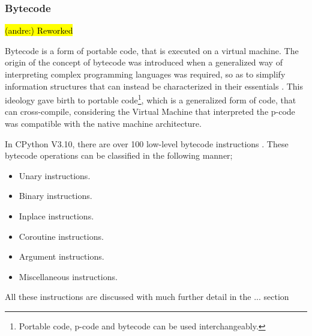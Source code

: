 \documentclass[12pt, a4paper]{report}
\DeclareRobustCommand{\andre}[1]{ {\begingroup\sethlcolor{BurntOrange}\hl{(andre:) #1}\endgroup} }
\theoremstyle{definition}
\theoremstyle{definition}%
\theoremstyle{definition}%
\theoremstyle{definition}%
\theoremstyle{definition}%
\theoremstyle{definition}%
\begin{document}
{            \subsubsection*{Bytecode}
            \label{subsubsec:bytecode}
            \andre{Reworked}
            \par Bytecode is a form of portable code, that is executed on a virtual machine. The origin of the concept of bytecode was introduced when a generalized way 
            of interpreting complex programming languages was required, so as to simplify information structures that can instead be characterized in their essentials \cite{landin1964mechanical}.
            This ideology gave birth to portable code\footnote{Portable code, p-code and bytecode can be used interchangeably.}, which is a  generalized form of code, that can cross-compile, considering
            the Virtual Machine that interpreted the p-code was compatible with the native machine architecture. 
            \par In CPython V3.10, there are over 100 low-level bytecode instructions \cite{pythonofficial2022docsdismodule}. These bytecode operations can be classified in the following manner;
            \begin{itemize}
                \item Unary instructions.
                \item Binary instructions.
                \item Inplace instructions.
                \item Coroutine instructions.
                \item Argument instructions.
                \item Miscellaneous instructions.
            \end{itemize}
            \par All these instructions are discussed with much further detail in the ... section 
            
}
\end{document}
